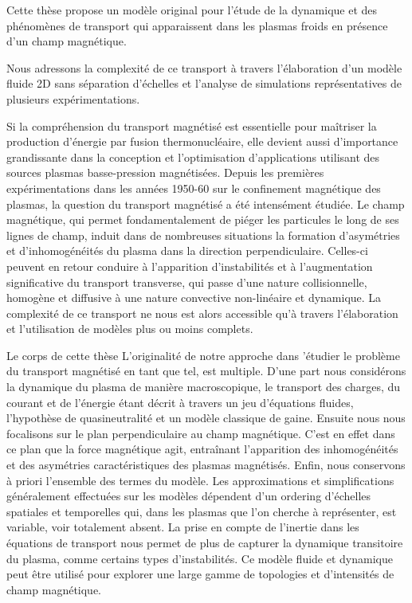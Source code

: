 
\begin{refsection}

Cette thèse propose un modèle original pour l'étude de la dynamique et des
		phénomènes de transport qui apparaissent dans les plasmas froids en présence
		d'un champ magnétique. 
		
		Nous adressons la complexité de ce transport à travers l’élaboration d'un
		modèle fluide 2D sans séparation d'échelles et l'analyse de simulations
		représentatives de plusieurs expérimentations.
			
		Si la compréhension du transport magnétisé est essentielle pour maîtriser la
		production d'énergie par fusion thermonucléaire, elle devient aussi d'importance
		grandissante dans la conception et l'optimisation d'applications utilisant des
		sources plasmas basse-pression magnétisées.
		Depuis les premières expérimentations dans les années 1950-60 sur le
		confinement magnétique des plasmas, la question du transport magnétisé a été intensément
		étudiée. Le champ magnétique, qui permet fondamentalement de piéger les
		particules le long de ses lignes de champ, induit dans de nombreuses situations la formation
		d'asymétries et d'inhomogénéités du plasma dans la direction perpendiculaire.
		Celles-ci peuvent en retour conduire à l'apparition d'instabilités et à
		l'augmentation significative du transport transverse, qui passe d'une nature
		collisionnelle, homogène et diffusive à une nature convective non-linéaire et
		dynamique. La complexité de ce transport ne nous est alors accessible qu'à
		travers l'élaboration et l'utilisation de modèles plus ou moins complets.
				
		Le corps de cette thèse L'originalité de notre approche dans
		'étudier le problème du transport magnétisé en tant que tel,  est multiple.
		D'une part nous considérons la dynamique du plasma de manière macroscopique, le
		transport des charges, du courant et de l'énergie étant décrit à travers un jeu
		d'équations fluides, l'hypothèse de quasineutralité et un modèle classique de
		gaine.
		Ensuite nous nous focalisons sur le plan perpendiculaire au champ magnétique.
		C'est en effet dans ce plan que la force magnétique agit, entraînant
		l'apparition des inhomogénéités et des asymétries caractéristiques des plasmas
		magnétisés.
		Enfin, nous conservons à priori l'ensemble des termes du modèle.
		Les approximations et simplifications généralement effectuées sur les
		modèles dépendent d'un ordering d'échelles spatiales et temporelles qui, dans
		les plasmas que l'on cherche à représenter, est variable, voir totalement
		absent.
		La prise en compte de l'inertie dans les équations de transport nous permet de
		plus de capturer la dynamique transitoire du plasma, comme certains types
		d'instabilités. Ce modèle fluide et dynamique peut être utilisé pour explorer
		une large gamme de topologies et d'intensités de champ magnétique.
				

\end{refsection}
